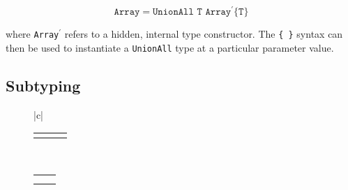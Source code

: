 \vspace{-3ex}
\[
\texttt{Array} = \texttt{UnionAll T Array$^\prime$\{T\}}
\]

\noindent
where \texttt{Array$^\prime$} refers to a hidden, internal type constructor.
The \texttt{\{ \}} syntax can then be used to instantiate a \texttt{UnionAll}
type at a particular parameter value.


\subsection{Subtyping}
\label{sec:subtyping}

\begin{figure}[!t]
  \begin{center}
    \def\arraystretch{2}
    \begin{tabular}{|c|}\hline
      \begin{tabular}{ccc}
        \AxiomC{$_A^B X^L, \Gamma\ \vdash\ T \leq S$}
        \UnaryInfC{$\Gamma\ \vdash\ \exists$ $_A^B X\ T\ \leq\ S$}
        \DisplayProof

        \hspace{3ex}

        &

        \AxiomC{$_A^BX^R, \Gamma\ \vdash\ T \leq S$}
        \UnaryInfC{$\Gamma\ \vdash\ T\ \leq\ \exists$ $_A^B X\ S$}
        \DisplayProof

        \hspace{3ex}

        &

        \AxiomC{}
        \UnaryInfC{$\Gamma\ \vdash\ X \leq X$}
        \DisplayProof
      \end{tabular}

      \\[8pt]

      \begin{tabular}{cc}
        \AxiomC{$^BX^L,{} _AY^L,\Gamma\ \vdash\ B \leq Y\ \vee\ X \leq A$}
        \UnaryInfC{$^BX^L,{} _AY^L,\Gamma\ \vdash\ X \leq Y$}
        \DisplayProof

        \hspace{4ex}

        &

        \AxiomC{$_A^BX^R,{} Y^R,\Gamma\ \vdash\ B \leq A$}
        \UnaryInfC{$_A^BX^R,{} Y^R,\Gamma\ \vdash\ X \leq Y$}
        \DisplayProof

        \\[8pt]

        \AxiomC{$_A^BX^R,\Gamma\ \vdash\ T \leq B$}
        \UnaryInfC{$_{A \cup T}^{\ \ \ B}X^R,\Gamma\ \vdash\ T \leq X$}
        \DisplayProof


\end{tabular}
\end{tabular}
\end{center}
\end{figure}
